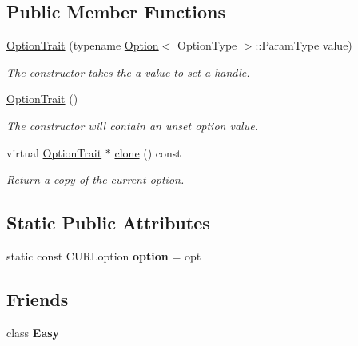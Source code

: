\subsection*{Public Member Functions}
\begin{DoxyCompactItemize}
\item 
\hypertarget{classcurlpp_1_1OptionTrait_a8798a968833b5f95ae0c4da466232906}{\hyperlink{classcurlpp_1_1OptionTrait_a8798a968833b5f95ae0c4da466232906}{Option\-Trait} (typename \hyperlink{classcurlpp_1_1Option}{Option}$<$ Option\-Type $>$\-::Param\-Type value)}\label{classcurlpp_1_1OptionTrait_a8798a968833b5f95ae0c4da466232906}

\begin{DoxyCompactList}\small\item\em The constructor takes the a value to set a handle. \end{DoxyCompactList}\item 
\hyperlink{classcurlpp_1_1OptionTrait_a345c9d4f8468a716c7954666f22fb9d8}{Option\-Trait} ()
\begin{DoxyCompactList}\small\item\em The constructor will contain an unset option value. \end{DoxyCompactList}\item 
virtual \hyperlink{classcurlpp_1_1OptionTrait}{Option\-Trait} $\ast$ \hyperlink{classcurlpp_1_1OptionTrait_a2e0254ab4187bf413d8c53a0114a191d}{clone} () const 
\begin{DoxyCompactList}\small\item\em Return a copy of the current option. \end{DoxyCompactList}\end{DoxyCompactItemize}
\subsection*{Static Public Attributes}
\begin{DoxyCompactItemize}
\item 
\hypertarget{classcurlpp_1_1OptionTrait_a06451f77383083ea93233c612bdf1b92}{static const C\-U\-R\-Loption {\bfseries option} = opt}\label{classcurlpp_1_1OptionTrait_a06451f77383083ea93233c612bdf1b92}

\end{DoxyCompactItemize}
\subsection*{Friends}
\begin{DoxyCompactItemize}
\item 
\hypertarget{classcurlpp_1_1OptionTrait_aca01636a4dba40614b164b807fa9cb9f}{class {\bfseries Easy}}\label{classcurlpp_1_1OptionTrait_aca01636a4dba40614b164b807fa9cb9f}

\end{DoxyCompactItemize}
